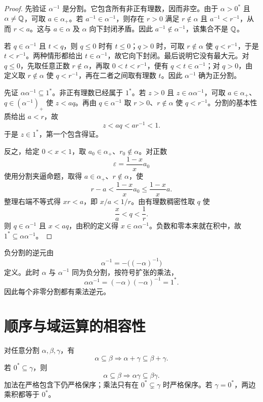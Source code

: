 \begin{proof}
先验证 \(\alpha^{-1}\) 是分割。它包含所有非正有理数，因而非空。由于 \(\alpha>0^*\) 且 \(\alpha\ne\mathbb{Q}\)，可取 \(a\in\alpha_+\)。若 \(a^{-1}\in\alpha^{-1}\)，则存在 \(r>0\) 满足 \(r\notin\alpha\) 且 \(a^{-1}<r^{-1}\)，从而 \(r<a\)。这与 \(a\in\alpha\) 及 \(\alpha\) 向下封闭矛盾。因此 \(a^{-1}\notin\alpha^{-1}\)，该集合不是 \(\mathbb{Q}\)。

若 \(q\in\alpha^{-1}\) 且 \(t<q\)，则 \(q\le 0\) 时有 \(t\le0\)；\(q>0\) 时，可取 \(r\notin\alpha\) 使 \(q<r^{-1}\)，于是 \(t<r^{-1}\)。两种情形都给出 \(t\in\alpha^{-1}\)，故它向下封闭。最后说明它没有最大元。对 \(q\le0\)，先取任意正数 \(r\notin\alpha\)，再取 \(0<t<r^{-1}\)，便有 \(q<t\in\alpha^{-1}\)；对 \(q>0\)，由定义取 \(r\notin\alpha\) 使 \(q<r^{-1}\)，再在二者之间取有理数 \(t\)。因此 \(\alpha^{-1}\) 确为正分割。

先证 \(\alpha\alpha^{-1}\subseteq1^*\)。非正有理数已经属于 \(1^*\)。若 \(z>0\) 且 \(z\in\alpha\alpha^{-1}\)，可取 \(a\in\alpha_+\)、\(q\in(\alpha^{-1})_+\) 使 \(z<aq\)。再由 \(q\in\alpha^{-1}\) 取 \(r>0\)、\(r\notin\alpha\) 使 \(q<r^{-1}\)。分割的基本性质给出 \(a<r\)，故
\[
 z<aq<ar^{-1}<1.
\]
于是 \(z\in1^*\)，第一个包含得证。

反之，给定 \(0<x<1\)，取 \(a_0\in\alpha_+\)、\(r_0\notin\alpha\)。对正数
\[
 \varepsilon=\frac{1-x}{x}a_0
\]
使用分割夹逼命题，取得 \(a\in\alpha_+\)、\(r\notin\alpha\)，使
\[
 r-a<\frac{1-x}{x}a_0\le\frac{1-x}{x}a.
\]
整理右端不等式得 \(xr<a\)，即 \(x/a<1/r\)。由有理数稠密性取 \(q\) 使
\[
  \frac{x}{a}<q<\frac1r.
\]
则 \(q\in\alpha^{-1}\) 且 \(x<aq\)，由积的定义得 \(x\in\alpha\alpha^{-1}\)。负数和零本来就在积中，故 \(1^*\subseteq\alpha\alpha^{-1}\)。
\end{proof}

负分割的逆元由
\[
  \alpha^{-1}=-\bigl((-\alpha)^{-1}\bigr)
\]
定义。此时 \(\alpha\) 与 \(\alpha^{-1}\) 同为负分割，按符号扩张的乘法，
\[
  \alpha\alpha^{-1}
  =(-\alpha)(-\alpha)^{-1}
  =1^*.
\]
因此每个非零分割都有乘法逆元。

\section{顺序与域运算的相容性}

\begin{proposition}[序与运算的相容性细化]
对任意分割 \(\alpha,\beta,\gamma\)，有
\[
 \alpha\subseteq\beta
 \Longrightarrow
 \alpha+\gamma\subseteq\beta+\gamma.
\]
若 \(0^*\subseteq\gamma\)，则
\[
 \alpha\subseteq\beta
 \Longrightarrow
 \alpha\gamma\subseteq\beta\gamma.
\]
加法在严格包含下仍严格保序；乘法只有在 \(0^*\subsetneq\gamma\) 时严格保序。若 \(\gamma=0^*\)，两边乘积都等于 \(0^*\)。
\end{proposition}


